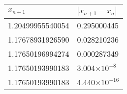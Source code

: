 \documentclass{article} %
\begin{document}
	
\begin{tabular}{ll}
	\rowcolor{LightBlue2} $x_{n+1}$ & $|x_{n+1}-x_n|$\\ \hline
	\cellcolor[gray]{0.80} 1.20499955540054 & 0.295000445\\
	1.17678931926590 & 0.028210236\\
	1.17650196994274 & 0.000287349\\
	1.17650193990183 & 3.004$\times10^{-8}$\\
	\cellcolor[gray]{0.80} 1.17650193990183 & 4.440$\times10^{-16}$\\ \hline
\end{tabular}
\end{document}
